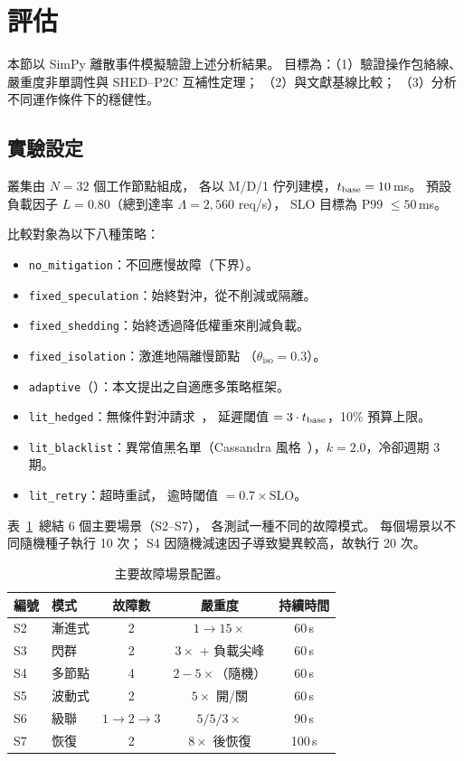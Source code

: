 \section{評估}
\label{sec:evaluation}

本節以 SimPy 離散事件模擬驗證上述分析結果。
目標為：（1）驗證操作包絡線、嚴重度非單調性與 SHED--P2C 互補性定理；
（2）與文獻基線比較；
（3）分析不同運作條件下的穩健性。

\subsection{實驗設定}

叢集由 $N = 32$ 個工作節點組成，
各以 M/D/1 佇列建模，$t_{\text{base}} = 10$\,ms。
預設負載因子 $L = 0.80$（總到達率 $\Lambda = 2{,}560$ req/s），
SLO 目標為 P99 $\leq 50$\,ms。

比較對象為以下八種策略：
\begin{itemize}
\item \texttt{no\_mitigation}：不回應慢故障（下界）。
\item \texttt{fixed\_speculation}：始終對沖，從不削減或隔離。
\item \texttt{fixed\_shedding}：始終透過降低權重來削減負載。
\item \texttt{fixed\_isolation}：激進地隔離慢節點
  （$\theta_{\text{iso}} = 0.3$）。
\item \texttt{adaptive}（\system{}）：本文提出之自適應多策略框架。
\item \texttt{lit\_hedged}：無條件對沖請求~\cite{dean2013tail}，
  延遲閾值 $= 3 \cdot t_{\text{base}}$，10\% 預算上限。
\item \texttt{lit\_blacklist}：異常值黑名單（Cassandra
  風格~\cite{lakshman2010cassandra}），$k = 2.0$，冷卻週期 3 期。
\item \texttt{lit\_retry}：超時重試，
  逾時閾值 $= 0.7 \times \text{SLO}$。
\end{itemize}

表~\ref{tab:scenarios}~總結 6 個主要場景（S2--S7），
各測試一種不同的故障模式。
每個場景以不同隨機種子執行 10 次；
S4 因隨機減速因子導致變異較高，故執行 20 次。

\begin{table}[t]
\centering
\caption{主要故障場景配置。}
\label{tab:scenarios}
\small
\begin{tabular}{@{}llccc@{}}
\toprule
編號 & 模式 & 故障數 & 嚴重度 & 持續時間 \\
\midrule
S2 & 漸進式 & 2 & $1{\to}15\times$ & 60\,s \\
S3 & 閃群 & 2 & $3\times$ + 負載尖峰 & 60\,s \\
S4 & 多節點 & 4 & $2{-}5\times$（隨機） & 60\,s \\
S5 & 波動式 & 2 & $5\times$ 開/關 & 60\,s \\
S6 & 級聯 & $1{\to}2{\to}3$ & $5/5/3\times$ & 90\,s \\
S7 & 恢復 & 2 & $8\times$ 後恢復 & 100\,s \\
\bottomrule
\end{tabular}
\end{table}

